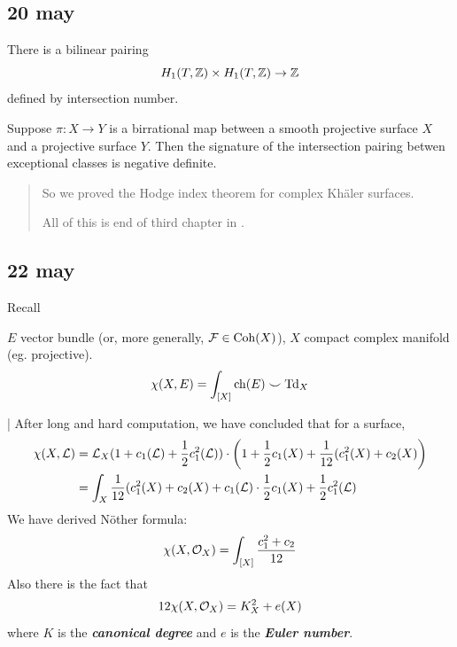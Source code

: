 \subsection{20 may}
There is a bilinear pairing
\[H_1(T,\mathbb{Z})\times H_1(T,\mathbb{Z})\to\mathbb{Z}\]
defined by intersection number.

\begin{thm}
	Suppose $\pi:X\to Y$ is a birrational map between a smooth projective surface $X$ and a projective surface $Y$. Then the signature of the intersection pairing betwen exceptional classes is negative definite.
\end{thm}
\begin{quotation}
	So we proved the Hodge index theorem for complex Khäler surfaces.
	
	All of this is end of third chapter in \cite{huybrechts}.
\end{quotation}
\subsection{22 may}
Recall
\begin{thm}
	$E$ vector bundle (or, more generally, $\mathcal{F}\in\operatorname{Coh}(X)$), $X$ compact complex manifold (eg. projective).
	\[\chi(X,E)=\int_{[X]}\operatorname{ch}(E)\smile \operatorname{Td}_X\]
\end{thm}|
After long and hard computation, we have concluded that for a surface,
\begin{align*}
	\chi(X,\mathcal{L})&=\mathcal{L}_X(1+c_1(\mathcal{L})+\frac{1}{2}c_1^2(\mathcal{L}))\cdot\left(1+\frac{1}{2}c_1(X)+\frac{1}{12}(c_1^2(X)+c_2(X)\right)\\
	&=\int_X\frac{1}{12}(c_1^2(X)+c_2(X)+c_1(\mathcal{L})\cdot\frac{1}{2}c_1(X)+\frac{1}{2}c_1^2(\mathcal{L})
\end{align*}
We have derived Nöther formula:
\[\chi(X,\mathcal{O}_X)=\int_{[X]}\frac{c_1^2+c_2}{12}\]
Also there is the fact that
\[12\chi(X,\mathcal{O}_X)=K_X^2+e(X)\]
where $K$ is the \textbf{\textit{canonical degree}} and $e$ is the \textbf{\textit{Euler number}}.

